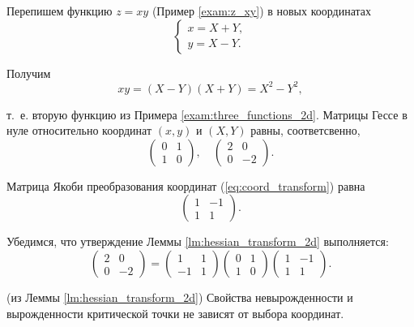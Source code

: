 \documentclass[a4paper,12pt,openany,leqno]{extbook}
\begin{document}
    \begin{example}
    Перепишем функцию $z = xy$ (Пример \ref{exam:z_xy}) в новых координатах
    \begin{equation}
    \begin{cases}
    x = X + Y,\\
    y = X - Y.
    \end{cases}
    \label{eq:coord_transform}
    \end{equation}
    
    Получим
    \[
    xy = (X - Y)(X + Y) = X^2 - Y^2,
    \]
    
    т.~е. вторую функцию из Примера \ref{exam:three_functions_2d}. Матрицы Гессе в нуле относительно координат $(x, y)$ и $(X, Y)$ равны, соответсвенно,
    \[
\left(
  \begin{array}{cc}
    0 & 1\\
    1 & 0
  \end{array}
\right),
    \quad
\left(
  \begin{array}{cc}
    2 & 0\\
    0 & -2
  \end{array}
\right).
    \]
    
    Матрица Якоби преобразования координат (\ref{eq:coord_transform}) равна
    \[
\left(
  \begin{array}{cc}
    1 & -1\\
    1 & 1
  \end{array}
\right).
    \]
    
    Убедимся, что утверждение Леммы \ref{lm:hessian_transform_2d} выполняется:
    \[
\left(
  \begin{array}{cc}
    2 & 0\\
    0 & -2
  \end{array}
\right) = 
\left(
  \begin{array}{cc}
    1 & 1\\
    -1 & 1
  \end{array}
\right)
\left(
  \begin{array}{cc}
    0 & 1\\
    1 & 0
  \end{array}
\right)
\left(
  \begin{array}{cc}
    1 & -1\\
    1 & 1
  \end{array}
\right).
\]
    \end{example}
    
\begin{corollary} (из Леммы \ref{lm:hessian_transform_2d}) Свойства невырожденности и вырожденности критической точки не зависят от выбора координат.
\label{corol:degeneracy_2d}
\end{corollary}
\end{document}
